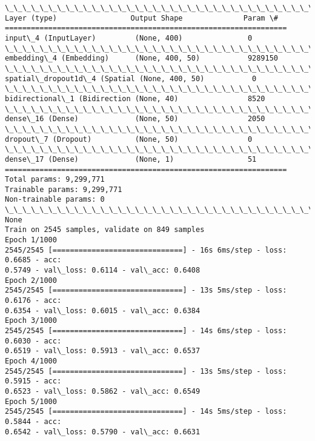\documentclass[11pt]{article}
\begin{document}
    \begin{Verbatim}[commandchars=\\\{\}]
\_\_\_\_\_\_\_\_\_\_\_\_\_\_\_\_\_\_\_\_\_\_\_\_\_\_\_\_\_\_\_\_\_\_\_\_\_\_\_\_\_\_\_\_\_\_\_\_\_\_\_\_\_\_\_\_\_\_\_\_\_\_\_\_\_
Layer (type)                 Output Shape              Param \#
=================================================================
input\_4 (InputLayer)         (None, 400)               0
\_\_\_\_\_\_\_\_\_\_\_\_\_\_\_\_\_\_\_\_\_\_\_\_\_\_\_\_\_\_\_\_\_\_\_\_\_\_\_\_\_\_\_\_\_\_\_\_\_\_\_\_\_\_\_\_\_\_\_\_\_\_\_\_\_
embedding\_4 (Embedding)      (None, 400, 50)           9289150
\_\_\_\_\_\_\_\_\_\_\_\_\_\_\_\_\_\_\_\_\_\_\_\_\_\_\_\_\_\_\_\_\_\_\_\_\_\_\_\_\_\_\_\_\_\_\_\_\_\_\_\_\_\_\_\_\_\_\_\_\_\_\_\_\_
spatial\_dropout1d\_4 (Spatial (None, 400, 50)           0
\_\_\_\_\_\_\_\_\_\_\_\_\_\_\_\_\_\_\_\_\_\_\_\_\_\_\_\_\_\_\_\_\_\_\_\_\_\_\_\_\_\_\_\_\_\_\_\_\_\_\_\_\_\_\_\_\_\_\_\_\_\_\_\_\_
bidirectional\_1 (Bidirection (None, 40)                8520
\_\_\_\_\_\_\_\_\_\_\_\_\_\_\_\_\_\_\_\_\_\_\_\_\_\_\_\_\_\_\_\_\_\_\_\_\_\_\_\_\_\_\_\_\_\_\_\_\_\_\_\_\_\_\_\_\_\_\_\_\_\_\_\_\_
dense\_16 (Dense)             (None, 50)                2050
\_\_\_\_\_\_\_\_\_\_\_\_\_\_\_\_\_\_\_\_\_\_\_\_\_\_\_\_\_\_\_\_\_\_\_\_\_\_\_\_\_\_\_\_\_\_\_\_\_\_\_\_\_\_\_\_\_\_\_\_\_\_\_\_\_
dropout\_7 (Dropout)          (None, 50)                0
\_\_\_\_\_\_\_\_\_\_\_\_\_\_\_\_\_\_\_\_\_\_\_\_\_\_\_\_\_\_\_\_\_\_\_\_\_\_\_\_\_\_\_\_\_\_\_\_\_\_\_\_\_\_\_\_\_\_\_\_\_\_\_\_\_
dense\_17 (Dense)             (None, 1)                 51
=================================================================
Total params: 9,299,771
Trainable params: 9,299,771
Non-trainable params: 0
\_\_\_\_\_\_\_\_\_\_\_\_\_\_\_\_\_\_\_\_\_\_\_\_\_\_\_\_\_\_\_\_\_\_\_\_\_\_\_\_\_\_\_\_\_\_\_\_\_\_\_\_\_\_\_\_\_\_\_\_\_\_\_\_\_
None
Train on 2545 samples, validate on 849 samples
Epoch 1/1000
2545/2545 [==============================] - 16s 6ms/step - loss: 0.6685 - acc:
0.5749 - val\_loss: 0.6114 - val\_acc: 0.6408
Epoch 2/1000
2545/2545 [==============================] - 13s 5ms/step - loss: 0.6176 - acc:
0.6354 - val\_loss: 0.6015 - val\_acc: 0.6384
Epoch 3/1000
2545/2545 [==============================] - 14s 6ms/step - loss: 0.6030 - acc:
0.6519 - val\_loss: 0.5913 - val\_acc: 0.6537
Epoch 4/1000
2545/2545 [==============================] - 13s 5ms/step - loss: 0.5915 - acc:
0.6523 - val\_loss: 0.5862 - val\_acc: 0.6549
Epoch 5/1000
2545/2545 [==============================] - 14s 5ms/step - loss: 0.5844 - acc:
0.6542 - val\_loss: 0.5790 - val\_acc: 0.6631

\end{Verbatim}
\end{document}

